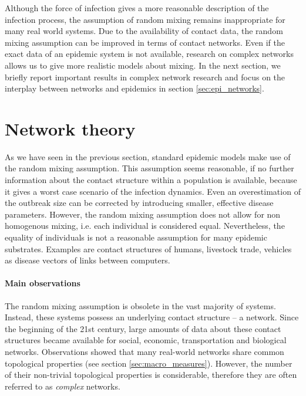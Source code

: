 \documentclass[openright,twoside,headsepline]{scrbook}
\begin{document}
Although the force of infection gives a more reasonable description of the infection process, the assumption of random mixing remains inappropriate for many real world systems.
Due to the availability of contact data, the random mixing assumption can be improved in terms of contact networks.
Even if the exact data of an epidemic system is not available, research on complex networks allows us to give more realistic models about mixing.
In the next section, we briefly report important results in complex network research and focus on the interplay between networks and epidemics in section \ref{sec:epi_networks}.


\section{Network theory}\label{sec:network_theory}
As we have seen in the previous section, standard epidemic models make use of the random mixing assumption.
This assumption seems reasonable, if no further information about the contact structure within a population is available, because it gives a worst case scenario of the infection dynamics.
Even an overestimation of the outbreak size can be corrected by introducing smaller, effective disease parameters.
However, the random mixing assumption does not allow for non homogenous mixing, i.e. each individual is considered equal.
Nevertheless, the equality of individuals is not a reasonable assumption for many epidemic substrates.
Examples are contact structures of humans, livestock trade, vehicles as disease vectors of links between computers.

\paragraph{Main observations\color{Cayenne}{.}}
The random mixing assumption is obsolete in the vast majority of systems.
Instead, these systems possess an underlying contact structure -- a network.
Since the beginning of the 21st century, large amounts of data about these contact structures became available for social, economic, transportation and biological networks.
Observations showed that many real-world networks share common topological properties (see section \ref{sec:macro_measures}).
However, the number of their non-trivial topological properties is considerable, therefore they are often referred to as \emph{complex} networks.
\end{document}
